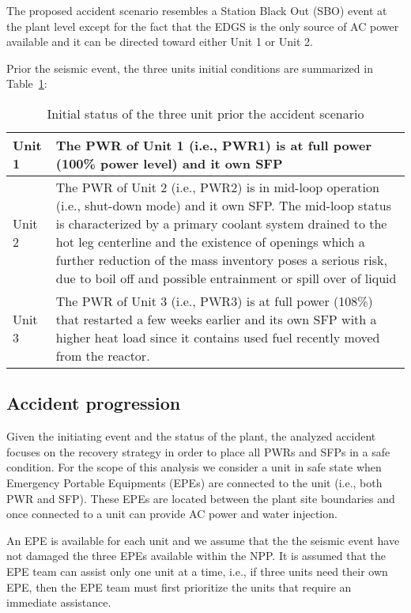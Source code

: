 The proposed accident scenario resembles a Station Black Out (SBO) event at the plant level except for the 
fact that the EDGS is the only source of AC power available and it can be directed toward either Unit 1 or Unit 2.

Prior the seismic event, the three units initial conditions are summarized in Table~\ref{tab:unitsStatus}:

\begin{table}
  \begin{tabular}{ | l | p{10cm} | }
    \hline      
      Unit 1 &  The PWR of Unit 1 (i.e., PWR1) is at full power (100\% power level) and it own SFP \\ \hline
      Unit 2 &  The PWR of Unit 2 (i.e., PWR2) is in mid-loop operation (i.e., shut-down mode) and it own SFP. 
                The mid-loop status is characterized by a primary coolant system drained to the 
                hot leg centerline and the existence of openings which a further reduction of 
                the mass inventory poses a serious risk, due to boil off and possible entrainment 
                or spill over of liquid\\ \hline
      Unit 3 &  The PWR of Unit 3 (i.e., PWR3) is at full power (108\%) that restarted a few weeks 
                earlier and its own SFP with a higher heat load since it contains used fuel recently 
                moved from the reactor. \\
    \hline  
  \end{tabular}
  \caption{Initial status of the three unit prior the accident scenario}
  \label{tab:unitsStatus}
\end{table}


\subsection{Accident progression}

Given the initiating event and the status of the plant, the analyzed accident focuses on the recovery strategy 
in order to place all PWRs and SFPs in a safe condition. For the scope of this analysis we consider a unit in
safe state when Emergency Portable Equipments (EPEs) are connected to the unit (i.e., both PWR and SFP). These EPEs 
are located between the plant site boundaries and once connected to a unit can provide AC power and water injection.

An EPE is available for each unit and we assume that the the seismic event have not damaged the three EPEs available 
within the NPP. It is assumed that the EPE team can assist only one unit at a time, i.e., if three units need their 
own EPE, then the EPE team must first prioritize the units that require an immediate assistance.
  
